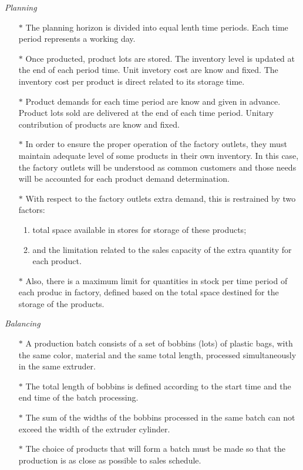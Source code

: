 \emph{Planning}

\begin{itemize}
\item [$\ast$] The planning horizon is divided into equal lenth time periods. Each time period represents a working day.
\item [$\ast$] Once producted, product lots are stored. The inventory level is updated at the end of each period time. Unit invetory cost are know and fixed. The inventory cost per product is direct related to its storage time.
\item [$\ast$] Product demands for each time period are know and given in advance. Product lots sold are delivered at the end of each time period. Unitary contribution of products are know and fixed.
\item [$\ast$] In order to ensure the proper operation of the factory outlets, they must maintain adequate level of some products in their own inventory. In this case, the factory outlets will be understood as common customers and those needs will be accounted for each product demand determination.
\item [$\ast$] With respect to the factory outlets extra demand, this is restrained by two factors: 
		 \begin{enumerate}
		 \item total space available in stores for storage of these products;
		 \item and the limitation related to the sales capacity of the extra quantity for each product.
		 \end{enumerate}
\item [$\ast$] Also, there is a maximum limit for quantities in stock per time period of each produc in factory, defined based on the total space destined for the storage of the products.
\end{itemize}

\emph{Balancing}

\begin{itemize}
\item [$\ast$] A production batch consists of a set of bobbins (lots) of plastic bags, with the same color, material and the same total length, processed simultaneously in the same extruder.
\item [$\ast$] The total length of bobbins is defined according to the start time and the end time of the batch processing.
\item [$\ast$] The sum of the widths of the bobbins processed in the same batch can not exceed the width of the extruder cylinder.
\item [$\ast$] The choice of products that will form a batch must be made so that the production is as close as possible to sales schedule.
\end{itemize}

